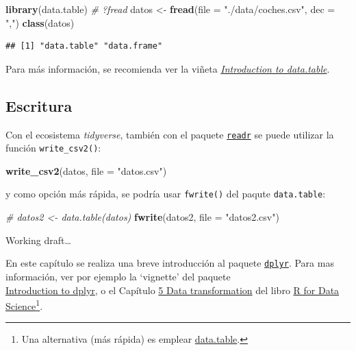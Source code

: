 \documentclass[
]{book}
\newenvironment{Shaded}{\begin{snugshade}}{\end{snugshade}}
\newcommand{\AttributeTok}[1]{\textcolor[rgb]{0.13,0.29,0.53}{#1}}
\newcommand{\CommentTok}[1]{\textcolor[rgb]{0.56,0.35,0.01}{\textit{#1}}}
\newcommand{\FunctionTok}[1]{\textcolor[rgb]{0.13,0.29,0.53}{\textbf{#1}}}
\newcommand{\NormalTok}[1]{#1}
\newcommand{\OtherTok}[1]{\textcolor[rgb]{0.56,0.35,0.01}{#1}}
\newcommand{\StringTok}[1]{\textcolor[rgb]{0.31,0.60,0.02}{#1}}
\begin{document}
\begin{Shaded}
\begin{Highlighting}[]
\FunctionTok{library}\NormalTok{(data.table)}
\CommentTok{\# ?fread}
\NormalTok{datos }\OtherTok{\textless{}{-}} \FunctionTok{fread}\NormalTok{(}\AttributeTok{file =} \StringTok{"./data/coches.csv"}\NormalTok{, }\AttributeTok{dec =} \StringTok{","}\NormalTok{)}
\FunctionTok{class}\NormalTok{(datos) }
\end{Highlighting}
\end{Shaded}

\begin{verbatim}
## [1] "data.table" "data.frame"
\end{verbatim}

Para más información, se recomienda ver la viñeta \href{https://rdatatable.gitlab.io/data.table/articles/datatable-intro.html}{\emph{Introduction to data.table}}.

\hypertarget{writer}{%
\subsection{Escritura}\label{writer}}

Con el ecosistema \emph{tidyverse}, también con el paquete \href{https://readr.tidyverse.org}{\texttt{readr}} se puede utilizar la función \texttt{write\_csv2()}:

\begin{Shaded}
\begin{Highlighting}[]
\FunctionTok{write\_csv2}\NormalTok{(datos, }\AttributeTok{file =} \StringTok{"datos.csv"}\NormalTok{)}
\end{Highlighting}
\end{Shaded}

y como opción más rápida, se podría usar \texttt{fwrite()} del paqute \texttt{data.table}:

\begin{Shaded}
\begin{Highlighting}[]
\CommentTok{\# datos2 \textless{}{-} data.table(datos)}
\FunctionTok{fwrite}\NormalTok{(datos2, }\AttributeTok{file =} \StringTok{"datos2.csv"}\NormalTok{)}
\end{Highlighting}
\end{Shaded}

Working draft\ldots{}

En este capítulo se realiza una breve introducción al paquete \href{https://dplyr.tidyverse.org/index.html}{\texttt{dplyr}}.
Para mas información, ver por ejemplo la `vignette' del paquete\\
\href{https://cran.rstudio.com/web/packages/dplyr/vignettes/dplyr.html}{Introduction to dplyr},
o el Capítulo \href{http://r4ds.had.co.nz/transform.html}{5 Data transformation} del libro
\href{http://r4ds.had.co.nz}{R for Data Science}\footnote{Una alternativa (más rápida) es emplear
  \href{https://rdatatable.gitlab.io/data.table}{data.table}.}.
\end{document}
